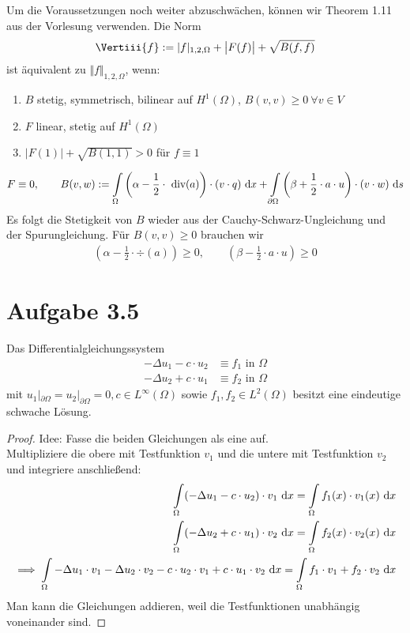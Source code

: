 \documentclass[12pt,a4paper]{article}
\begin{document}
\begin{lösung}
Um die Voraussetzungen noch weiter abzuschwächen, können wir Theorem 1.11 aus der Vorlesung verwenden. Die Norm
\begin{align*}
\Vertiii{f}:=|f|_{1,2,\Omega}+\big|F(f)\big|+\sqrt{B(f,f)}
\end{align*}
ist äquivalent zu $\Vert f\Vert_{1,2,\Omega}$, wenn:
\begin{enumerate}
\item $B$ stetig, symmetrisch, bilinear auf $H^1(\Omega)$, $B(v,v)\geq0~\forall v\in V$
\item $F$ linear, stetig auf $H^1(\Omega)$
\item $\big|F(1)\big|+\sqrt{B(1,1)}>0$ für $f\equiv1$
\end{enumerate}
\begin{align*}
F\equiv 0,\qquad B(v,w):=\int\limits_\Omega\left(\alpha-\frac{1}{2}\cdot\text{ div}(a)\right)\cdot(v\cdot q)\text{ d} x+\int\limits_{\partial\Omega}\left(\beta+\frac{1}{2}\cdot a\cdot u\right)\cdot(v\cdot w)\text{ d} s
\end{align*}
Es folgt die Stetigkeit von $B$ wieder aus der Cauchy-Schwarz-Ungleichung und der Spurungleichung. Für $B(v,v)\geq0$ brauchen wir
\begin{align*}
\left(\alpha-\frac{1}{2}\cdot\div(a)\right)\geq 0,\qquad
\left(\beta-\frac{1}{2}\cdot a\cdot u\right)\geq 0
\end{align*}
\end{lösung}

\section*{Aufgabe 3.5}
Das Differentialgleichungssystem
\begin{align*}
-\Delta u_1-c\cdot u_2&\equiv f_1\text{ in }\Omega\\
-\Delta u_2+c\cdot u_1&\equiv f_2\text{ in }\Omega
\end{align*}
mit $u_1|_{\partial\Omega}=u_2|_{\partial\Omega}=0,c\in L^\infty(\Omega)$ sowie $f_1,f_2\in L^2(\Omega)$ besitzt eine eindeutige schwache Lösung.

\begin{proof}
Idee: Fasse die beiden Gleichungen als eine auf.\\
Multipliziere die obere mit Testfunktion $v_1$ und die untere mit Testfunktion $v_2$ und integriere anschließend:
\begin{align*}
\int\limits_\Omega(-\Delta u_1-c\cdot u_2)\cdot v_1\text{ d} x=\int\limits_\Omega f_1(x)\cdot v_1(x)\text{ d} x\\
\int\limits_\Omega(-\Delta u_2+c\cdot u_1)\cdot v_2\text{ d} x=\int\limits_\Omega f_2(x)\cdot v_2(x)\text{ d} x\\
\implies
\int\limits_\Omega -\Delta u_1\cdot v_1-\Delta u_2\cdot v_2-c\cdot u_2\cdot v_1+c\cdot u_1\cdot v_2\text{ d} x=\int\limits_\Omega f_1\cdot v_1+f_2\cdot v_2\text{ d} x
\end{align*}
Man kann die Gleichungen addieren, weil die Testfunktionen unabhängig voneinander sind.

\end{proof}
\end{document}
